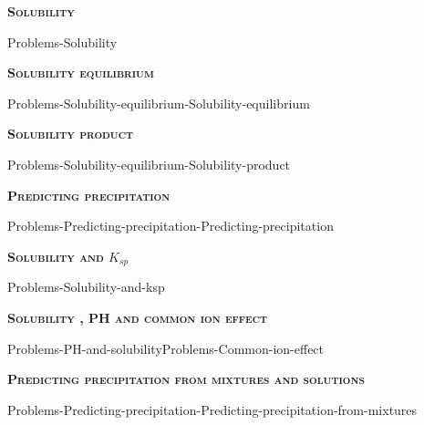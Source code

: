 \documentclass[main.tex]{subfiles}
\newcommand\chapterlabel{Ch-solubility}
\begin{document}
\newpage
 
\fancyhfoffset[E,O]{0pt}
\setlength{\columnsep}{30pt}
\begin{conclusion}
\end{conclusion}
\begin{multicols*}{2}\setcounter{numA}{1}
{\raggedright\textsc{\textbf{Solubility }}\par} {Problems-Solubility}
 
{\raggedright\textsc{\textbf{Solubility equilibrium}}\par}{Problems-Solubility-equilibrium-Solubility-equilibrium}

{\raggedright\textsc{\textbf{Solubility product}}\par} {Problems-Solubility-equilibrium-Solubility-product}
{\raggedright\textsc{\textbf{Predicting precipitation}}\par} {Problems-Predicting-precipitation-Predicting-precipitation}
 {\raggedright\textsc{\textbf{Solubility and $K_{sp}$}}\par} {Problems-Solubility-and-ksp}
 {\raggedright\textsc{\textbf{Solubility , PH and common ion effect}}\par} {Problems-PH-and-solubility}{Problems-Common-ion-effect}

   {\raggedright\textsc{\textbf{Predicting precipitation from mixtures and solutions}}\par} {Problems-Predicting-precipitation-Predicting-precipitation-from-mixtures}


\end{multicols*} \iftoggle{showfinalanswers}{
\newpage\fancyhfoffset[E,O]{0pt}
\begin{answerbox}
\begin{answersenvironment}
 \begin{localsize}{10}
{ \checkoddpage\ifoddpage    \else   \clearpage\thispagestyle{empty}\mbox{}\clearpage\fi
\Large \bf Answers}
\SetupExSheets{ headings = inline-nr , counter-format = qu) ,}
\printsolutions 
  \vspace{20cm}
 \end{localsize}
 \end{answersenvironment}
\end{answerbox}
}{}
\checkoddpage\ifoddpage   \clearpage\thispagestyle{empty}\mbox{}\clearpage \else   \fi
\end{document}
